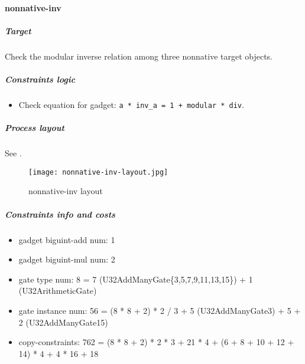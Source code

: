 \paragraph{nonnative-inv}

\subparagraph{Target}
Check the modular inverse relation among three nonnative target objects.

\subparagraph{Constraints logic}
\begin{itemize}
    \item Check equation for gadget: \verb|a * inv_a = 1 + modular * div|.
\end{itemize}

\subparagraph{Process layout}
See .
\begin{figure}[!ht]
    \centering
    \texttt{[image: nonnative-inv-layout.jpg]}
    \caption{nonnative-inv layout}
    \label{fig:nonnative-inv-layout}
\end{figure}

\subparagraph{Constraints info and costs}
\begin{itemize}
    \item gadget biguint-add num: 1
    \item gadget biguint-mul num: 2
    \item gate type num: 8 = 7 (U32AddManyGate\{3,5,7,9,11,13,15\}) + 1 (U32ArithmeticGate)
    \item gate instance num: 56 = (8 * 8 + 2) * 2 / 3 + 5 (U32AddManyGate{3}) + 5 + 2 (U32AddManyGate{15})
    \item copy-constraints: 762 = (8 * 8 + 2) * 2 * 3 + 21 * 4 + (6 + 8 + 10 + 12 + 14) * 4 + 4 * 16 + 18
\end{itemize}
